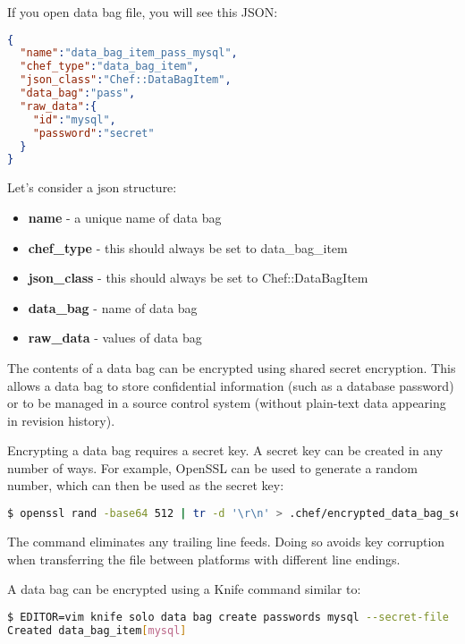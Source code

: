 If you open data bag file, you will see this JSON:

\begin{lstlisting}[language=JSON,label=lst:my-cloud-chef-databag10,title=my-cloud/data\_bags/pass/mysql.json]
{
  "name":"data_bag_item_pass_mysql",
  "chef_type":"data_bag_item",
  "json_class":"Chef::DataBagItem",
  "data_bag":"pass",
  "raw_data":{
    "id":"mysql",
    "password":"secret"
  }
}
\end{lstlisting}

Let's consider a json structure:

\begin{itemize}
  \item \textbf{name} - a unique name of data bag
  \item \textbf{chef\_type} - this should always be set to data\_bag\_item
  \item \textbf{json\_class} - this should always be set to Chef::DataBagItem
  \item \textbf{data\_bag} - name of data bag
  \item \textbf{raw\_data} - values of data bag
\end{itemize}

The contents of a data bag can be encrypted using shared secret encryption. This allows a data bag to store confidential information (such as a database password) or to be managed in a source control system (without plain-text data appearing in revision history).

Encrypting a data bag requires a secret key. A secret key can be created in any number of ways. For example, OpenSSL can be used to generate a random number, which can then be used as the secret key:

\begin{lstlisting}[language=Bash,label=lst:my-cloud-chef-databag5]
$ openssl rand -base64 512 | tr -d '\r\n' > .chef/encrypted_data_bag_secret
\end{lstlisting}

The  command eliminates any trailing line feeds. Doing so avoids key corruption when transferring the file between platforms with different line endings.

A data bag can be encrypted using a Knife command similar to:

\begin{lstlisting}[language=Bash,label=lst:my-cloud-chef-databag6]
$ EDITOR=vim knife solo data bag create passwords mysql --secret-file .chef/encrypted_data_bag_secret
Created data_bag_item[mysql]
\end{lstlisting}

